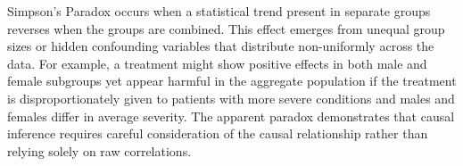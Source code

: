 Simpson's Paradox occurs when a statistical trend present in separate groups reverses when the groups are combined. This effect emerges from unequal group sizes or hidden confounding variables that distribute non-uniformly across the data. For example, a treatment might show positive effects in both male and female subgroups yet appear harmful in the aggregate population if the treatment is disproportionately given to patients with more severe conditions and males and females differ in average severity. The apparent paradox demonstrates that causal inference requires careful consideration of the causal relationship rather than relying solely on raw correlations.
